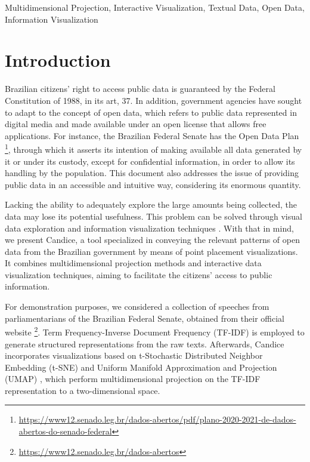 \documentclass[conference]{IEEEtran}
\begin{document}
\begin{IEEEkeywords}
Multidimensional Projection, Interactive Visualization, Textual Data, Open Data, Information Visualization
\end{IEEEkeywords}

\section{Introduction}
Brazilian citizens' right to access public data is guaranteed by the Federal Constitution of 1988, in its art, 37. In addition, government agencies have sought to adapt to the concept of open data, which refers to public data represented in digital media and made available under an open license that allows free applications. For instance, the Brazilian Federal Senate has the Open Data Plan \footnote{ \url{https://www12.senado.leg.br/dados-abertos/pdf/plano-2020-2021-de-dados-abertos-do-senado-federal}}, through which it asserts its intention of making available all data generated by it or under its custody, except for confidential information, in order to allow its handling by the population. This document also addresses the issue of providing public data in an accessible and intuitive way, considering its enormous quantity. 

Lacking the ability to adequately explore the large amounts being collected, the data may lose its potential usefulness. This problem can be solved through visual data exploration and information visualization techniques \cite{b1}. With that in mind, we present Candice, a tool specialized in conveying the relevant patterns of open data from the Brazilian government by means of point placement visualizations. It combines multidimensional projection methods and interactive data visualization techniques, aiming to facilitate the citizens’ access to public information. 

For demonstration purposes, we considered a collection of speeches from parliamentarians of the Brazilian Federal Senate, obtained from their official website \footnote{\url{https://www12.senado.leg.br/dados-abertos}}. Term Frequency-Inverse Document Frequency (TF-IDF) is employed to generate structured representations from the raw texts. Afterwards, Candice incorporates visualizations based on t-Stochastic Distributed Neighbor Embedding (t-SNE) \cite{b2} and Uniform Manifold Approximation and Projection (UMAP) \cite{b3}, which perform multidimensional projection on the TF-IDF representation to a two-dimensional space.
\end{document}
